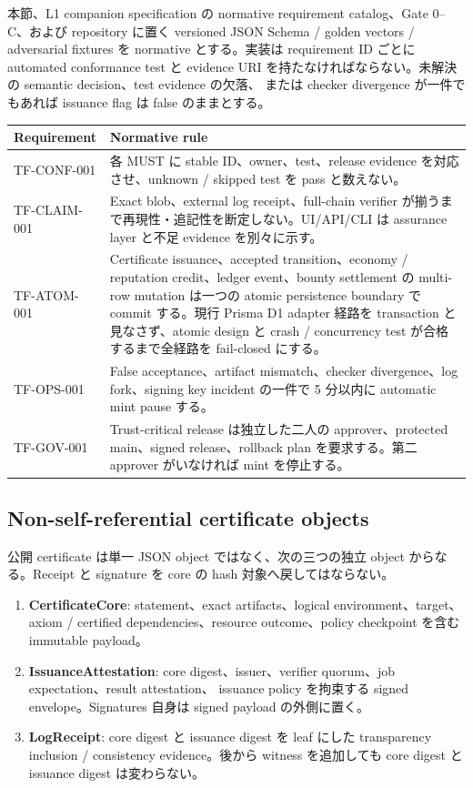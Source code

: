 \documentclass[a4paper,11pt]{ltjsarticle}
\newcommand{\term}[1]{\textbf{\color{TFNavy}#1}}
\begin{document}
本節、L1 companion specification の normative requirement catalog、Gate 0--C、および repository に置く
versioned JSON Schema / golden vectors / adversarial fixtures を normative とする。実装は requirement ID ごとに
automated conformance test と evidence URI を持たなければならない。未解決の semantic decision、test evidence の欠落、
または checker divergence が一件でもあれば issuance flag は false のままとする。

\begin{tabularx}{0.96\linewidth}{@{}L{28mm}Y@{}}
\toprule
\textbf{Requirement} & \textbf{Normative rule} \\
\midrule
TF-CONF-001 & 各 MUST に stable ID、owner、test、release evidence を対応させ、unknown / skipped test を pass と数えない。 \\
TF-CLAIM-001 & Exact blob、external log receipt、full-chain verifier が揃うまで再現性・追記性を断定しない。UI/API/CLI は assurance layer と不足 evidence を別々に示す。 \\
TF-ATOM-001 & Certificate issuance、accepted transition、economy / reputation credit、ledger event、bounty settlement の multi-row mutation は一つの atomic persistence boundary で commit する。現行 Prisma D1 adapter 経路を transaction と見なさず、atomic design と crash / concurrency test が合格するまで全経路を fail-closed にする。 \\
TF-OPS-001 & False acceptance、artifact mismatch、checker divergence、log fork、signing key incident の一件で 5 分以内に automatic mint pause する。 \\
TF-GOV-001 & Trust-critical release は独立した二人の approver、protected main、signed release、rollback plan を要求する。第二 approver がいなければ mint を停止する。 \\
\bottomrule
\end{tabularx}

\subsection{Non-self-referential certificate objects}

公開 certificate は単一 JSON object ではなく、次の三つの独立 object からなる。Receipt と signature を core の
hash 対象へ戻してはならない。

\begin{enumerate}
  \item \term{CertificateCore}: statement、exact artifacts、logical environment、target、axiom / certified
        dependencies、resource outcome、policy checkpoint を含む immutable payload。
  \item \term{IssuanceAttestation}: core digest、issuer、verifier quorum、job expectation、result attestation、
        issuance policy を拘束する signed envelope。Signatures 自身は signed payload の外側に置く。
  \item \term{LogReceipt}: core digest と issuance digest を leaf にした transparency inclusion / consistency
        evidence。後から witness を追加しても core digest と issuance digest は変わらない。
\end{enumerate}
\end{document}
